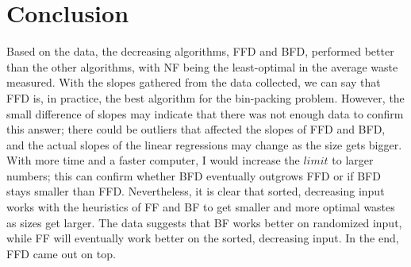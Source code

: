 \documentclass{article}
\begin{document}
\section{Conclusion}
    Based on the data, the decreasing algorithms, FFD and BFD, 
    performed better than the other algorithms, with NF being the least-optimal 
    in the average waste measured. With the slopes gathered from the data 
    collected, we can say that FFD is, in practice, the best algorithm for the 
    bin-packing problem. However, the small difference of slopes may indicate 
    that there was not enough data to confirm this answer; there could be
    outliers that affected the slopes of FFD and BFD, and the actual slopes of 
    the linear regressions may change as the size gets bigger. With more time 
    and a faster computer, I would increase the $limit$ to larger numbers; this 
    can confirm whether BFD eventually outgrows FFD or if BFD stays smaller than 
    FFD.
    \nextblurb
    Nevertheless, it is clear that sorted, decreasing input works with the
    heuristics of FF and BF to get smaller and more optimal wastes as sizes get
    larger. The data suggests that BF works better on randomized input, while 
    FF will eventually work better on the sorted, decreasing input. In the end, 
    FFD came out on top.
\end{document}
